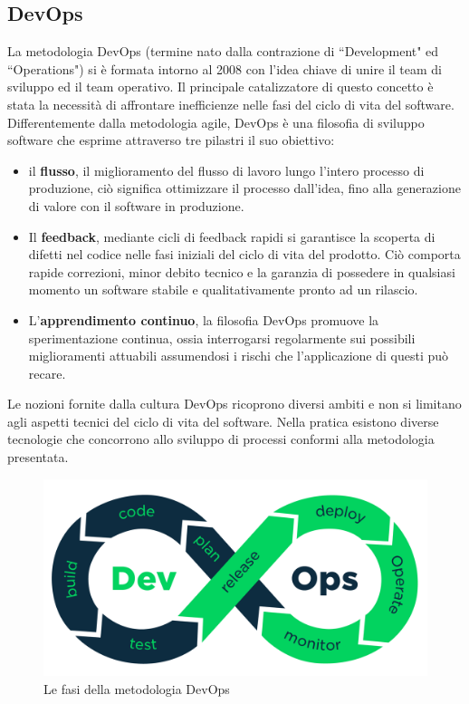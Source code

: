 \subsection{DevOps}
La metodologia DevOps (termine nato dalla contrazione di ``Development" ed ``Operations") si è formata intorno al 2008 con l'idea chiave di unire il team di sviluppo ed il team operativo. Il principale catalizzatore di questo concetto è stata la necessità di affrontare inefficienze nelle fasi del ciclo di vita del software. Differentemente dalla metodologia agile, DevOps è una filosofia di sviluppo software che esprime attraverso tre pilastri il suo obiettivo:

\begin{itemize}
	\item il \textbf{flusso}, il miglioramento del flusso di lavoro lungo l'intero processo di produzione, ciò significa ottimizzare il processo dall'idea, fino alla generazione di valore con il software in produzione.
	\item Il \textbf{feedback}, mediante cicli di feedback rapidi si garantisce la scoperta di difetti nel codice nelle fasi iniziali del ciclo di vita del prodotto. Ciò comporta rapide correzioni, minor debito tecnico e la garanzia di possedere in qualsiasi momento un software stabile e qualitativamente pronto ad un rilascio.
	\item L'\textbf{apprendimento continuo}, la filosofia DevOps promuove la sperimentazione continua, ossia interrogarsi regolarmente sui possibili miglioramenti attuabili assumendosi i rischi che l'applicazione di questi può recare.
\end{itemize}

Le nozioni fornite dalla cultura DevOps ricoprono diversi ambiti e non si limitano agli aspetti tecnici del ciclo di vita del software. Nella pratica esistono diverse tecnologie che concorrono allo sviluppo di processi conformi alla metodologia presentata.

\begin{figure}[htb]
	\centering
	\includegraphics[width=.8\linewidth]{figures/devops-process.png}
	\caption{Le fasi della metodologia DevOps}
	\label{fig:devops-process}
\end{figure}

